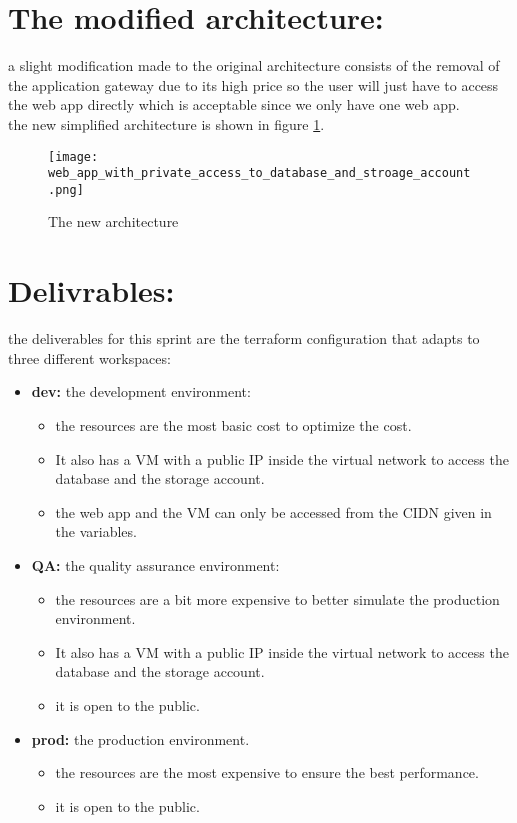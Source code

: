 \section{The modified architecture:}
a slight modification made to the original architecture consists of the removal of the application gateway due to its high price so the user will just have to access the web app directly which is acceptable since we only have one web app.
\\ the new simplified architecture is shown in figure \ref{fig:new_arch}.

\begin{figure}[htpb]
    \centering
    \texttt{[image: web\_app\_with\_private\_access\_to\_database\_and\_stroage\_account.png]}
    \caption{The new architecture}
    \label{fig:new_arch}
\end{figure}

\section{Delivrables:}
the deliverables for this sprint are the terraform configuration that adapts to three different workspaces:
\begin{itemize}
    \item \textbf{dev:} the development environment:
          \begin{itemize}
              \item the resources are the most basic cost to optimize the cost.
              \item It also has a VM with a public IP inside the virtual network to access the database and the storage account.
              \item the web app and the VM can only be accessed from the CIDN given in the variables.
          \end{itemize}
    \item \textbf{QA:} the quality assurance environment:
          \begin{itemize}
              \item the resources are a bit more expensive to better simulate the production environment.
              \item It also has a VM with a public IP inside the virtual network to access the database and the storage account.
              \item it is open to the public.
          \end{itemize}
    \item \textbf{prod:} the production environment.
          \begin{itemize}
              \item the resources are the most expensive to ensure the best performance.
              \item it is open to the public.
          \end{itemize}
\end{itemize}
